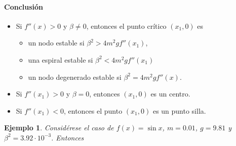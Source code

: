 \documentclass[11pt,letterpaper,draft]{report}
\newtheorem{exa}{Ejemplo}
\newcommand\<{\langle}
\renewcommand\>{\rangle}
\begin{document}
\paragraph{Conclusión}

\begin{itemize}
  \item
    Si $f''(x)>0$ y $\beta\neq 0$,
    entonces el punto crítico $(x_1,0)$ es
    \begin{itemize}
      \item
        un nodo estable si $\beta^{2}>4m^{2}gf''(x_1)$,
      \item
        una espiral estable si $\beta^{2}<4m^{2}gf''(x_1)$
      \item
        un nodo degenerado estable si $\beta^{2}=4m^{2}gf''(x)$.
    \end{itemize}
  \item
    Si $f''(x_1)>0$ y $\beta=0$, entonces $(x_1,0)$ es un centro.
  \item
    Si $f''(x_1)<0$, entonces el punto $(x_1,0)$ es un punto silla.
\end{itemize}

\begin{exa}
  Considérese el caso de $f(x)=\sin x$, $m=0.01$, $g=9.81$ y
  $\beta^{2}=3.92\cdot 10^{-3}$.
  Entonces
\end{exa}
\end{document}
